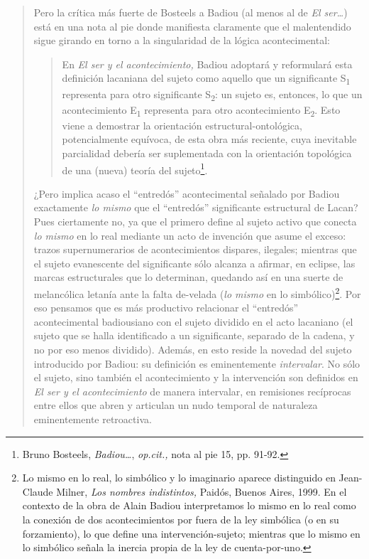 \begin{quote}
Pero la crítica más fuerte de Bosteels a Badiou (al menos al de \emph{El ser\ldots{}}) está en una nota al pie donde manifiesta claramente que el malentendido sigue girando en torno a la singularidad de la lógica acontecimental:

\begin{quote}
En \emph{El ser y el acontecimiento,} Badiou adoptará y reformulará esta definición lacaniana del sujeto como aquello que un significante S\textsubscript{1} representa para otro significante S\textsubscript{2}: un sujeto es, entonces, lo que un acontecimiento E\textsubscript{1} representa para otro acontecimiento E\textsubscript{2}. Esto viene a demostrar la orientación estructural-ontológica, potencialmente equívoca, de esta obra más reciente, cuya inevitable parcialidad debería ser suplementada con la orientación topológica de una (nueva) teoría del sujeto\footnote{Bruno Bosteels, \emph{Badiou\ldots{}}, \emph{op.cit.,} nota al pie 15, pp. 91-92.}.
\end{quote}

¿Pero implica acaso el \enquote{entredós} acontecimental señalado por Badiou exactamente \emph{lo mismo} que el \enquote{entredós} significante estructural de Lacan? Pues ciertamente no, ya que el primero define al sujeto activo que conecta \emph{lo mismo} en lo real mediante un acto de invención que asume el exceso: trazos supernumerarios de acontecimientos dispares, ilegales; mientras que el sujeto evanescente del significante sólo alcanza a afirmar, en eclipse, las marcas estructurales que lo determinan, quedando así en una suerte de melancólica letanía ante la falta de-velada (\emph{lo mismo} en lo simbólico)\footnote{Lo mismo en lo real, lo simbólico y lo imaginario aparece distinguido en Jean-Claude Milner, \emph{Los nombres indistintos,} Paidós, Buenos Aires, 1999. En el contexto de la obra de Alain Badiou interpretamos lo mismo en lo real como la conexión de dos acontecimientos por fuera de la ley simbólica (o en su forzamiento), lo que define una intervención-sujeto; mientras que lo mismo en lo simbólico señala la inercia propia de la ley de cuenta-por-uno.}. Por eso pensamos que es más productivo relacionar el \enquote{entredós} acontecimental badiousiano con el sujeto dividido en el acto lacaniano (el sujeto que se halla identificado a un significante, separado de la cadena, y no por eso menos dividido). Además, en esto reside la novedad del sujeto introducido por Badiou: su definición es eminentemente \emph{intervalar}. No sólo el sujeto, sino también el acontecimiento y la intervención son definidos en \emph{El ser y el acontecimiento} de manera intervalar, en remisiones recíprocas entre ellos que abren y articulan un nudo temporal de naturaleza eminentemente retroactiva.


\end{quote}

